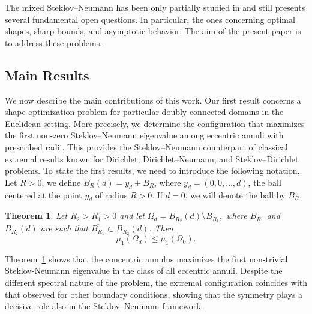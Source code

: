 \documentclass[12pt,reqno]{amsart}
\newtheorem{theorem}{Theorem}[section]
\numberwithin{equation}{section}
\numberwithin{theorem}{section}
\numberwithin{equation}{section}
\numberwithin{theorem}{section}
\begin{document}
The mixed Steklov--Neumann has been only partially studied in 
\cite{MR2758960, basak2024bounds, hassannezhad2020eigenvalue,
kao2025extremal} and still presents several fundamental open questions. In particular, the ones concerning optimal shapes, sharp bounds, and asymptotic behavior. The aim of the present paper is to address these problems.  
\subsection{Main Results}

We now describe the main contributions of this work. Our first result concerns
a shape optimization problem for particular doubly connected domains in the Euclidean setting.
More precisely, we determine the configuration that maximizes the first
non-zero Steklov--Neumann eigenvalue among eccentric annuli with prescribed
radii. This provides the Steklov--Neumann counterpart of classical extremal
results known for Dirichlet, Dirichlet--Neumann, and Steklov--Dirichlet
problems. To state the first results, we need to introduce the following notation. Let $R>0$,  we define $B_{R}(d) = y_d + B_{R}$, where $y_d = (0, 0, \dots, d)$, the ball centered at the point $y_d$ of radius $R>0$. If $d=0$, we will denote the ball by $B_R$.
\begin{theorem} \label{theorem: optimal}
Let $R_2>R_1>0$ and let  $\Omega_d = B_{R_2}(d) \setminus \overline{B_{R_1}},$
 where $B_{R_1}$ and $B_{R_2}(d)$ are such that $\overline{B_{R_1}} \subset B_{R_2}(d)$. Then, 
\begin{equation}
     \mu_1(\Omega_d)\leq \mu_1(\Omega_0).
 \end{equation}
 
\end{theorem}
\noindent Theorem~\ref{theorem: optimal} shows that the concentric annulus maximizes the first non-trivial Steklov-Neumann eigenvalue in the class of all eccentric annuli. Despite the different spectral
nature of the problem, the extremal configuration coincides with that
observed for other boundary conditions, showing that the symmetry plays a decisive role
also in the Steklov--Neumann framework.
\end{document}
